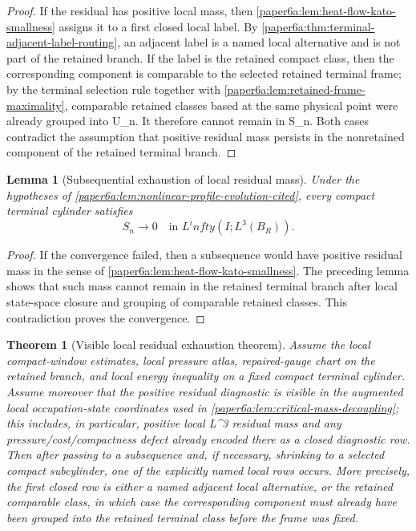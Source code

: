 \documentclass[11pt]{amsart}
\def\({}%
\def\){}%
\def\infty{infty}%
\theoremstyle{plain}
\newtheorem{theorem}{Theorem}[section]
\newtheorem{lemma}[lemma]{Lemma}
\theoremstyle{definition}
\theoremstyle{remark}
\begin{document}
\begin{proof}
If the residual has positive local mass, then
\cref{paper6a:lem:heat-flow-kato-smallness} assigns it to a first closed local
label.  By \cref{paper6a:thm:terminal-adjacent-label-routing}, an adjacent
label is a named local alternative and is not part of the retained branch.  If
the label is the retained compact class, then the corresponding component is
comparable to the selected retained terminal frame; by the terminal selection
rule together with \cref{paper6a:lem:retained-frame-maximality},
comparable retained classes based at the same physical point were already
grouped into \(U_n\).  It therefore cannot remain in \(S_n\).  Both cases
contradict the
assumption that positive residual mass persists in the nonretained component of
the retained terminal branch.
\end{proof}

\begin{lemma}[Subsequential exhaustion of local residual mass]
\label{paper6a:lem:profile-exhaustion-by-diagonal-extraction}
Under the hypotheses of
\cref{paper6a:lem:nonlinear-profile-evolution-cited}, every compact terminal
cylinder satisfies
\[
  S_n\to0
  \quad\text{in }L^\infty(I;L^3(B_R)).
\]
\end{lemma}

\begin{proof}
If the convergence failed, then a subsequence would have positive residual
mass in the sense of \cref{paper6a:lem:heat-flow-kato-smallness}.  The preceding
lemma shows that such mass cannot remain in the retained terminal branch after
local state-space closure and grouping of comparable retained classes.  This
contradiction proves the convergence.
\end{proof}

\begin{theorem}[Visible local residual exhaustion theorem]
\label{paper6a:thm:local-residual-exhaustion}
Assume the local compact-window estimates, local pressure atlas, repaired-gauge
chart on the retained branch, and local energy inequality on a fixed compact
terminal cylinder.  Assume moreover that the positive residual diagnostic is
visible in the augmented local occupation-state coordinates used in
\cref{paper6a:lem:critical-mass-decoupling}; this includes, in particular,
positive local \(L^3\) residual mass and any pressure/cost/compactness defect
already encoded there as a closed diagnostic row.  Then after passing to a
subsequence and, if necessary, shrinking to a selected compact subcylinder, one
of the explicitly named local rows occurs.  More precisely, the first closed
row is either a named adjacent local alternative, or the retained comparable
class, in which case the corresponding component must already have been grouped
into the retained terminal class before the frame was fixed.
\end{theorem}
\end{document}
